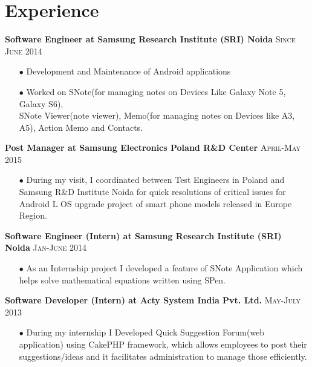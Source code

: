 \documentclass[letterpaper,11pt]{article}
\begin{document}

\section{Experience}

%
\normalsize{\textbf {Software Engineer at Samsung Research Institute (SRI) Noida}} \hfill{\textsc{Since June 2014}}
{
\begin{itemize}\setlength{\itemsep}{-1pt}
        \item [$\bullet$] Development and Maintenance of Android applications
        \item [$\bullet$] Worked on SNote{(for managing notes on Devices Like Galaxy Note 5, Galaxy S6)},\\ SNote Viewer(note viewer), Memo(for managing notes on Devices like A3, A5), Action Memo and Contacts. \\[-3mm]
 \end{itemize}
}
\normalsize{\textbf {Post Manager at Samsung Electronics Poland R\&D Center}} \hfill{\textsc{April-May 2015}}
{
\begin{itemize}\setlength{\itemsep}{-1pt}
        \item [$\bullet$] During my visit, I coordinated between Test Engineers in Poland and Samsung R\&D Institute Noida for quick resolutions of critical issues for Android L OS upgrade project of smart phone models released in Europe Region. \\[-3mm]
 \end{itemize}
}
\normalsize{\textbf {Software Engineer (Intern) at Samsung Research Institute (SRI) Noida}} \hfill{\textsc{Jan-June 2014}}
{
\begin{itemize}\setlength{\itemsep}{-1pt}
        \item [$\bullet$] As an Internship project I developed a feature of SNote Application which helps solve mathematical equations written using SPen. \\[-3mm]
 \end{itemize}
}
\normalsize{\textbf {Software Developer (Intern) at Acty System India Pvt. Ltd.}} \hfill{\textsc{May-July 2013}}
{
\begin{itemize}\setlength{\itemsep}{-1pt}
        \item [$\bullet$]During my internship I Developed Quick Suggestion Forum(web application) using CakePHP framework, which allows employees to post their suggestions/ideas and it facilitates administration to manage those efficiently. \\[-3mm]
 \end{itemize}
}
\end{document}
